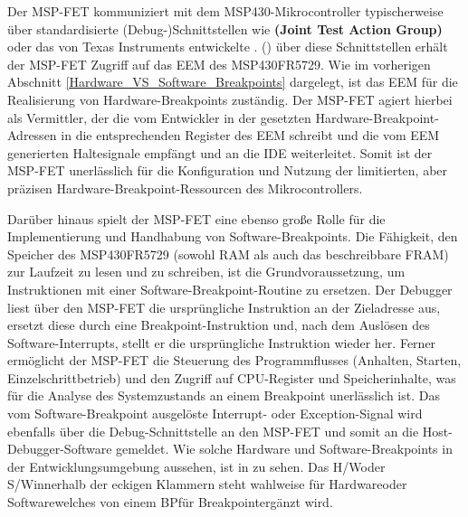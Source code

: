 Der MSP-FET kommuniziert mit dem MSP430-Mikrocontroller typischerweise \"uber standardisierte (Debug-)Schnittstellen wie \textbf{ (Joint Test Action Group)} oder das von Texas Instruments entwickelte . () \"uber diese Schnittstellen erh\"alt der MSP-FET Zugriff auf das EEM des MSP430FR5729. Wie im vorherigen Abschnitt \ref{Hardware_VS_Software_Breakpoints} dargelegt, ist das EEM f\"ur die Realisierung von Hardware-Breakpoints zust\"andig. Der MSP-FET agiert hierbei als Vermittler, der die vom Entwickler in der  gesetzten Hardware-Breakpoint-Adressen in die entsprechenden Register des EEM schreibt und die vom EEM generierten Haltesignale empf\"angt und an die IDE weiterleitet. Somit ist der MSP-FET unerl\"asslich f\"ur die Konfiguration und Nutzung der limitierten, aber pr\"azisen Hardware-Breakpoint-Ressourcen des Mikrocontrollers. 

Dar\"uber hinaus spielt der MSP-FET eine ebenso gro{\ss}e Rolle f\"ur die Implementierung und Handhabung von Software-Breakpoints. Die F\"ahigkeit, den Speicher des MSP430FR5729 (sowohl RAM als auch das beschreibbare FRAM) zur Laufzeit zu lesen und zu schreiben, ist die Grundvoraussetzung, um Instruktionen mit einer Software-Breakpoint-Routine zu ersetzen. Der Debugger liest \"uber den MSP-FET die urspr\"ungliche Instruktion an der Zieladresse aus, ersetzt diese durch eine Breakpoint-Instruktion und, nach dem Ausl\"osen des Software-Interrupts, stellt er die urspr\"ungliche Instruktion wieder her. Ferner erm\"oglicht der MSP-FET die Steuerung des Programmflusses (Anhalten, Starten, Einzelschrittbetrieb) und den Zugriff auf CPU-Register und Speicherinhalte, was f\"ur die Analyse des Systemzustands an einem Breakpoint unerl\"asslich ist. Das vom Software-Breakpoint ausgel\"oste Interrupt- oder Exception-Signal wird ebenfalls \"uber die Debug-Schnittstelle an den MSP-FET und somit an die Host-Debugger-Software gemeldet. Wie solche Hardware und Software-Breakpoints in der Entwicklungsumgebung aussehen, ist in  zu sehen. Das \glqq H/W\grqq oder \glqq S/W\grqq innerhalb der eckigen Klammern steht wahlweise f\"ur \glqq Hardware\grqq oder \glqq Software\grqq welches von einem \glqq BP\grqq f\"ur \glqq Breakpoint\grqq erg\"anzt wird.

